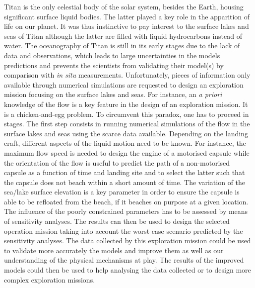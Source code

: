 Titan is the only celestial body of the solar system, besides the Earth, housing significant surface liquid bodies. The latter played a key role in the apparition of life on our planet. It was thus instinctive to pay interest to the surface lakes and seas of Titan although the latter are filled with liquid hydrocarbons instead of water. The oceanography of Titan is still in its early stages due to the lack of data and observations, which leads to large uncertainties in the models predictions and prevents the scientists from validating their model(s) by comparison with \textit{in situ} measurements. Unfortunately, pieces of information only available through numerical simulations are requested to design an exploration mission focusing on the surface lakes and seas. For instance, an \textit{a priori} knowledge of the flow is a key feature in the design of an exploration mission. It is a chicken-and-egg problem. To circumvent this paradox, one has to proceed in stages. The first step consists in running numerical simulations of the flow in the surface lakes and seas using the scarce data available. Depending on the landing craft, different aspects of the liquid motion need to be known. For instance, the maximum flow speed is needed to design the engine of a motorised capsule while the orientation of the flow is useful to predict the path of a non-motorised capsule as a function of time and landing site and to select the latter such that the capsule does not beach within a short amount of time. The variation of the sea/lake surface elevation is a key parameter in order to ensure the capsule is able to be refloated from the beach, if it beaches on purpose at a given location. The influence of the poorly constrained parameters has to be assessed by means of sensitivity analyses. The results can then be used to design the selected operation mission taking into account the worst case scenario predicted by the sensitivity analyses. The data collected by this exploration mission could be used to validate more accurately the models and improve them as well as our understanding of the physical mechanisms at play. The results of the improved models could then be used to help analysing the data collected or to design more complex exploration missions.

